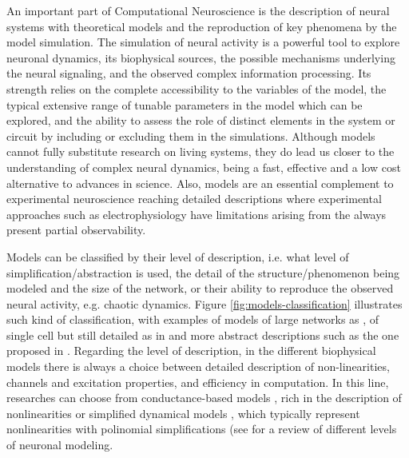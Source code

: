 An important part of Computational Neuroscience is the description of neural systems with theoretical models and the reproduction of key phenomena by the model simulation. The simulation of neural activity is a powerful tool to explore neuronal dynamics, its biophysical sources, the possible mechanisms underlying the neural signaling, and the observed complex information processing. Its strength relies on the complete accessibility to the variables of the model, the typical extensive range of tunable parameters in the model which can be explored,  and the ability to assess the role  of distinct elements in the system or circuit by including or excluding them in the simulations. Although models cannot fully substitute research on living systems, they do lead us closer to the understanding of complex neural dynamics, being a fast, effective and a low cost alternative to advances in science.  Also, models are an essential complement to experimental neuroscience reaching detailed descriptions where experimental approaches such as electrophysiology have limitations arising from the always present partial observability. 

Models can be classified by their level of description, i.e. what level of simplification/abstraction is used, the detail of the structure/phenomenon being modeled and the size of the network, or their ability to reproduce the observed neural activity, e.g. chaotic dynamics. Figure \ref{fig:models-classification} illustrates such kind of classification, with examples of models of large networks as \cite{potjans_cell-type_2014,bezaire_interneuronal_2016}, of single cell but still detailed as in \cite{smith_dendritic_2013} and more abstract descriptions such as the one proposed in \cite{izhikevich_simple_2003}. Regarding the level of description, in the different biophysical models there is always a choice between detailed description of non-linearities, channels and excitation properties, and efficiency in computation. In this line, researches can choose from conductance-based models  \cite{hodgkin_quantitative_1952}, rich in the description of nonlinearities or simplified dynamical models  \cite{hindmarsh_model_1984,fitzhugh_impulses_1961}, which typically represent nonlinearities with polinomial simplifications (see \cite{torres_modeling_2012} for a review of different levels of neuronal modeling. 


